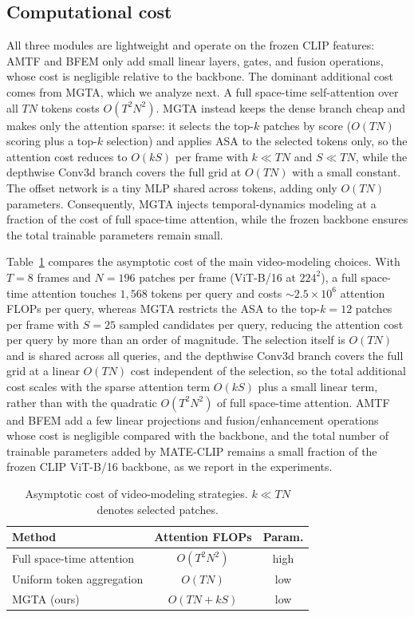 \subsection{Computational cost}
\label{sec:cost}
All three modules are lightweight and operate on the frozen CLIP features: AMTF and BFEM only add small linear layers, gates, and fusion operations, whose cost is negligible relative to the backbone.
The dominant additional cost comes from MGTA, which we analyze next.
A full space-time self-attention over all $T N$ tokens costs $O(T^2 N^2)$. MGTA instead keeps the dense branch cheap and makes only the attention sparse: it selects the top-$k$ patches by score ($O(T N)$ scoring plus a top-$k$ selection) and applies ASA to the selected tokens only, so the attention cost reduces to $O(k S)$ per frame with $k \ll T N$ and $S \ll T N$, while the depthwise Conv3d branch covers the full grid at $O(T N)$ with a small constant.
The offset network is a tiny MLP shared across tokens, adding only $O(T N)$ parameters.
Consequently, MGTA injects temporal-dynamics modeling at a fraction of the cost of full space-time attention, while the frozen backbone ensures the total trainable parameters remain small.

Table~\ref{tab:complexity} compares the asymptotic cost of the main video-modeling choices.
With $T=8$ frames and $N=196$ patches per frame (ViT-B/16 at $224^2$), a full space-time attention touches $1{,}568$ tokens per query and costs $\sim$$2.5 \times 10^6$ attention FLOPs per query, whereas MGTA restricts the ASA to the top-$k=12$ patches per frame with $S=25$ sampled candidates per query, reducing the attention cost per query by more than an order of magnitude.
The selection itself is $O(T N)$ and is shared across all queries, and the depthwise Conv3d branch covers the full grid at a linear $O(T N)$ cost independent of the selection, so the total additional cost scales with the sparse attention term $O(k S)$ plus a small linear term, rather than with the quadratic $O(T^2 N^2)$ of full space-time attention.
AMTF and BFEM add a few linear projections and fusion/enhancement operations whose cost is negligible compared with the backbone, and the total number of trainable parameters added by MATE-CLIP remains a small fraction of the frozen CLIP ViT-B/16 backbone, as we report in the experiments.

\begin{table}[t]
  \centering
  \footnotesize
  \begin{tabular}{lcc}
    \hline
    Method & Attention FLOPs & Param. \\
    \hline
    Full space-time attention & $O(T^2 N^2)$ & high \\
    Uniform token aggregation & $O(T N)$ & low \\
    MGTA (ours) & $O(T N + k S)$ & low \\
    \hline
  \end{tabular}
  \caption{Asymptotic cost of video-modeling strategies. $k \ll T N$ denotes selected patches.}
  \label{tab:complexity}
\end{table}
